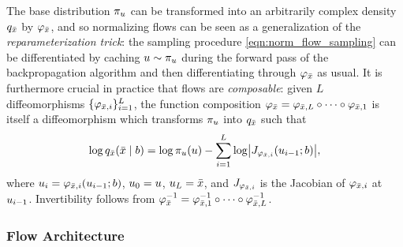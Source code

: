 The base distribution $\pi_{u}$ can be transformed into an arbitrarily complex density $q_{\bar{x}}$ by $\varphi_{\bar{x}}$,
and so normalizing flows can be seen as a generalization of the \textit{reparameterization trick}: the sampling procedure \eqref{eqn:norm_flow_sampling} can be differentiated by caching $u \sim \pi_{u}$ during the forward pass of the backpropagation algorithm and then differentiating through $\varphi_{\bar{x}}$ as usual.
It is furthermore crucial in practice that flows are \textit{composable}: given $L$ diffeomorphisms $\{\varphi_{\bar{x}, i}\}_{i=1}^{L}$, the function composition $\varphi_{\bar{x}} = \varphi_{\bar{x}, L} \circ \cdots \circ \varphi_{\bar{x}, 1}$ is itself a diffeomorphism which transforms $\pi_{u}$ into $q_{\bar{x}}$ such that
\begin{align}\label{eqn:norm_flow_density_sum}
    \log q_{\bar{\distbn}}(\bar{\distbn} \mid \signal)
    = \log \pi_{\vv{u}}(\vv{u})
    - \sum_{i=1}^{L}
    \log \AbsDet{\vv{J}_{\varphi_{\bar{\distbn}, i}}(\vv{u}_{i-1}; \signal)},
\end{align}
where $u_{i} = \varphi_{\bar{x}, i}(u_{i-1}; b)$, $u_{0} = u$, $u_{L} = \bar{x}$, and $J_{\varphi_{\bar{x}, i}}$ is the Jacobian of $\varphi_{\bar{x}, i}$ at $u_{i-1}$.
Invertibility follows from $\varphi_{\bar{x}}^{-1} = \varphi_{\bar{x}, 1}^{-1} \circ \cdots \circ \varphi_{\bar{x}, L}^{-1}$.

\subsubsection{Flow Architecture}\label{subsubsec:flow_architecture}

